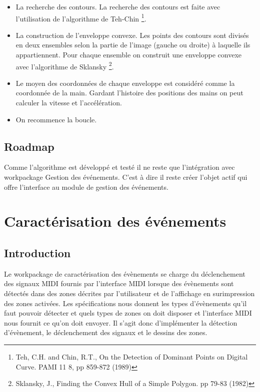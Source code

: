\begin{itemize}
\item La recherche des contours. La recherche des contours est faite avec l'utilisation de l'algorithme de Teh-Chin \footnote{Teh, C.H. and Chin, R.T., On the Detection of Dominant Points on Digital Curve. PAMI 11 8, pp 859-872 (1989)}.
\item La construction de l'enveloppe convexe. Les points des contours sont divisés en deux ensembles selon la partie de l'image (gauche ou droite) à laquelle ils appartiennent. Pour chaque ensemble on construit une enveloppe convexe avec l'algorithme de Sklansky \footnote{Sklansky, J., Finding the Convex Hull of a Simple Polygon. pp 79-83 (1982)
}.
\item Le moyen des coordonnées de chaque enveloppe est considéré comme la coordonnée de la main. Gardant l'histoire des positions des mains on peut calculer la vitesse et l’accélération. 
\item On recommence la boucle.
\end{itemize}
\subsection{Roadmap}
\par Comme l'algorithme est développé et testé il ne reste que l'intégration avec workpackage Gestion des événements. C'est à dire il reste créer l'objet actif qui offre l'interface au module de gestion des événements. 

\section{Caractérisation des événements}
\subsection{Introduction}
\par Le workpackage de caractérisation des évènements se charge du déclenchement des signaux MIDI fournis par l'interface MIDI lorsque des évènements sont détectés dans des zones décrites par l'utilisateur et de l'affichage en surimpression des zones activées. Les spécifications nous donnent les types d'évènements qu'il faut pouvoir détecter et quels types de zones on doit disposer et l'interface MIDI nous fournit ce qu'on doit envoyer. Il s'agit donc d'implémenter la détection d'évènement, le déclenchement des signaux et le dessins des zones.
